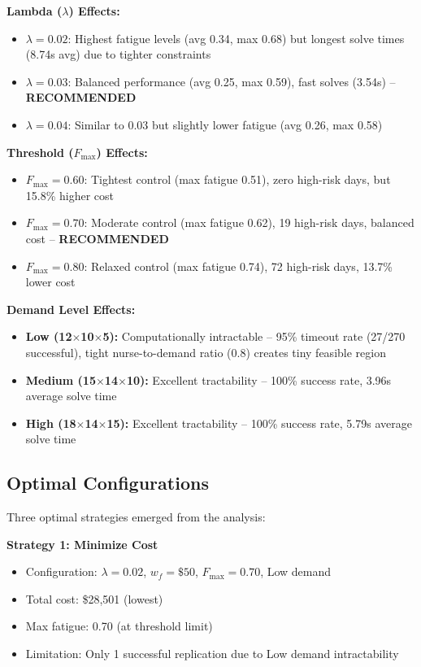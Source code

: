 \documentclass[11pt,letterpaper]{article}
\begin{document}
\textbf{Lambda ($\lambda$) Effects:}
\begin{itemize}[leftmargin=*]
    \item $\lambda=0.02$: Highest fatigue levels (avg 0.34, max 0.68) but longest solve times (8.74s avg) due to tighter constraints
    \item $\lambda=0.03$: Balanced performance (avg 0.25, max 0.59), fast solves (3.54s) -- \textbf{RECOMMENDED}
    \item $\lambda=0.04$: Similar to 0.03 but slightly lower fatigue (avg 0.26, max 0.58)
\end{itemize}

\textbf{Threshold ($F_{\max}$) Effects:}
\begin{itemize}[leftmargin=*]
    \item $F_{\max}=0.60$: Tightest control (max fatigue 0.51), zero high-risk days, but 15.8\% higher cost
    \item $F_{\max}=0.70$: Moderate control (max fatigue 0.62), 19 high-risk days, balanced cost -- \textbf{RECOMMENDED}
    \item $F_{\max}=0.80$: Relaxed control (max fatigue 0.74), 72 high-risk days, 13.7\% lower cost
\end{itemize}

\textbf{Demand Level Effects:}
\begin{itemize}[leftmargin=*]
    \item \textbf{Low (12$\times$10$\times$5):} Computationally intractable -- 95\% timeout rate (27/270 successful), tight nurse-to-demand ratio (0.8) creates tiny feasible region
    \item \textbf{Medium (15$\times$14$\times$10):} Excellent tractability -- 100\% success rate, 3.96s average solve time
    \item \textbf{High (18$\times$14$\times$15):} Excellent tractability -- 100\% success rate, 5.79s average solve time
\end{itemize}

\subsection{Optimal Configurations}

Three optimal strategies emerged from the analysis:

\textbf{Strategy 1: Minimize Cost}
\begin{itemize}[leftmargin=*]
    \item Configuration: $\lambda=0.02$, $w_f=\$50$, $F_{\max}=0.70$, Low demand
    \item Total cost: \$28,501 (lowest)
    \item Max fatigue: 0.70 (at threshold limit)
    \item Limitation: Only 1 successful replication due to Low demand intractability
\end{itemize}
\end{document}

